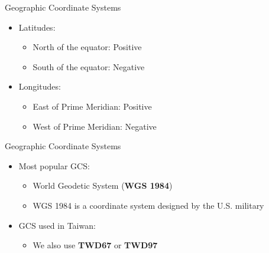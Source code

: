 \documentclass[hyperref={pdfpagelabels=false}]{beamer}
\begin{document}
\begin{frame}{Geographic Coordinate Systems}
	\begin{itemize}
		
		\item Latitudes:
		\vspace{0.2cm}
		\begin{itemize}
			\item North of the equator: Positive
			\vspace{0.2cm}
			\item South of the equator: Negative
		\end{itemize}
		\vspace{0.2cm}
		\item Longitudes:
		\vspace{0.2cm}
		\begin{itemize}
			\item East of Prime Meridian: Positive
			\vspace{0.2cm}
			\item West of Prime Meridian: Negative
		\end{itemize}
		
	\end{itemize}
\end{frame}




\begin{frame}{Geographic Coordinate Systems}
	\begin{itemize}
		
		\item Most popular GCS: 
		\begin{itemize}
			\vspace{0.2cm}
			\item World Geodetic System (\textbf{WGS 1984})
			\vspace{0.2cm}
			\item WGS 1984 is a coordinate system designed by the U.S. military
		\end{itemize}
		\vspace{0.2cm}
		\item GCS used in Taiwan:
		\vspace{0.2cm}
		\begin{itemize}
			\item We also use \textbf{TWD67} or \textbf{TWD97}
		\end{itemize}
		
	\end{itemize}
\end{frame}
\end{document}
